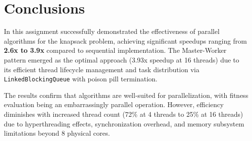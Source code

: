 \chapter{Conclusions} \label{cap:conclusions}

In this assignment successfully demonstrated the effectiveness of parallel
algorithms for the knapsack problem, achieving significant speedups ranging from
\textbf{2.6x to 3.9x} compared to sequential implementation. The Master-Worker
pattern emerged as the optimal approach (3.93x speedup at 16 threads) due to its
efficient thread lifecycle management and task distribution via
\texttt{LinkedBlockingQueue} with poison pill termination.

The results confirm that algorithms are well-suited for parallelization, with
fitness evaluation being an embarrassingly parallel operation. However,
efficiency diminishes with increased thread count (72\% at 4 threads to 25\% at
16 threads) due to hyperthreading effects, synchronization overhead, and memory
subsystem limitations beyond 8 physical cores.

